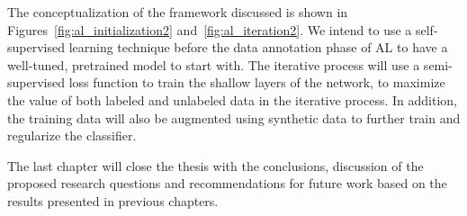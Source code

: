 The conceptualization of the framework discussed is shown in
Figures~\ref{fig:al_initialization2} and~\ref{fig:al_iteration2}. We intend to
use a self-supervised learning technique before the data annotation phase of
AL to have a well-tuned, pretrained model to start with. The iterative process
will use a semi-supervised loss function to train the shallow layers of the
network, to maximize the value of both labeled and unlabeled data in the
iterative process. In addition, the training data will also be augmented
using synthetic data to further train and regularize the classifier.

% 
% 

The last chapter will close the thesis with the conclusions, discussion of the
proposed research questions and recommendations for future work based on the
results presented in previous chapters.
